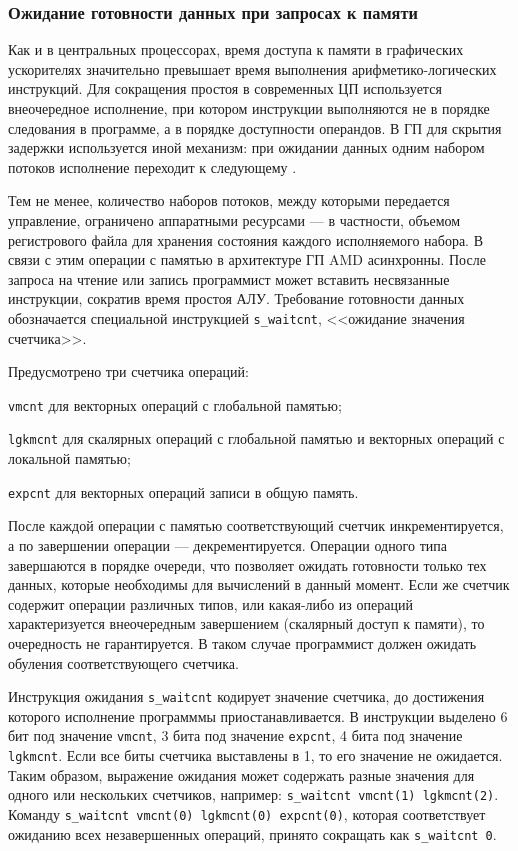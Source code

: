 \documentclass[a4paper,14pt]{extarticle}
\begin{document}
{\subsubsection{Ожидание готовности данных при запросах к памяти}
\label{section:gcn-waitcnt}

Как и в центральных процессорах, время доступа к памяти в графических ускорителях
значительно превышает время выполнения арифметико-логических инструкций.
Для сокращения простоя в современных ЦП используется внеочередное исполнение, при котором
инструкции выполняются не в порядке следования в программе, а в порядке доступности операндов.
В ГП для скрытия задержки используется иной механизм: при ожидании данных одним набором
потоков исполнение переходит к следующему \cite{gcn-performance}.

Тем не менее, количество наборов потоков, между которыми передается управление, ограничено
аппаратными ресурсами — в частности, объемом регистрового файла для хранения состояния каждого
исполняемого набора. В связи с этим операции с памятью в архитектуре ГП AMD асинхронны.
После запроса на чтение или запись программист может вставить несвязанные инструкции,
сократив время простоя АЛУ. Требование готовности данных обозначается специальной
инструкцией \verb|s_waitcnt|, <<ожидание значения счетчика>>.

Предусмотрено три счетчика операций:
\begin{ul}
\item \verb|vmcnt| для векторных операций с глобальной памятью;
\item \verb|lgkmcnt| для скалярных операций с глобальной памятью и векторных операций с локальной памятью;
\item \verb|expcnt| для векторных операций записи в общую память.
\end{ul}

После каждой операции с памятью соответствующий счетчик инкрементируется, а по завершении
операции — декрементируется. Операции одного типа завершаются в порядке очереди, что
позволяет ожидать готовности только тех данных, которые необходимы для вычислений в данный
момент. Если же счетчик содержит операции различных типов, или какая-либо из операций
характеризуется внеочередным завершением (скалярный доступ к памяти), то очередность не гарантируется.
В таком случае программист должен ожидать обуления соответствующего счетчика.

Инструкция ожидания \verb|s_waitcnt| кодирует значение счетчика, до достижения
которого исполнение программмы приостанавливается. В инструкции выделено 6 бит под значение
\verb|vmcnt|, 3 бита под значение \verb|expcnt|, 4 бита под значение \verb|lgkmcnt|.
Если все биты счетчика выставлены в 1, то его значение не ожидается. Таким образом,
выражение ожидания может содержать разные значения для одного или нескольких счетчиков,
например: \verb|s_waitcnt vmcnt(1) lgkmcnt(2)|. Команду
\verb|s_waitcnt vmcnt(0) lgkmcnt(0) expcnt(0)|, которая соответствует ожиданию всех
незавершенных операций, принято сокращать как \verb|s_waitcnt 0|.

}
\end{document}
